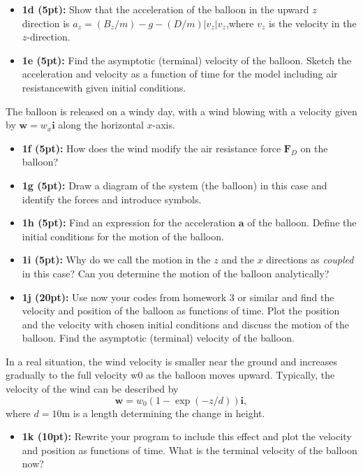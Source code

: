 \documentclass[%
oneside,                 %
final,                   %
10pt]{article}
\begin{document}
\begin{itemize}
\item \textbf{1d (5pt):} Show that the acceleration of the balloon in the upward $z$ direction is $a_z = (B_z/m)−g−(D/m)|v_z|v_z$,where $v_z$ is the velocity in the $z$-direction.

\item \textbf{1e (5pt):} Find the asymptotic (terminal) velocity of the balloon. Sketch the acceleration and velocity as a function of time for the model including air resistancewith given initial conditions.
\end{itemize}

\noindent
The balloon is released on a windy day, with a wind blowing with a velocity
given by $\bm{w} = w_x \bm{i}$ along the horizontal $x$-axis.

\begin{itemize}
\item \textbf{1f (5pt):} How does the wind modify the air resistance force $\bm{F}_D$ on the balloon?

\item \textbf{1g (5pt):} Draw a diagram of the system (the balloon) in this case and identify the forces and introduce symbols.

\item \textbf{1h (5pt):} Find an expression for the acceleration $\bm{a}$ of the balloon. Define the initial conditions for the motion of the balloon.

\item \textbf{1i (5pt):} Why do we call the motion in the $z$ and the $x$ directions as \emph{coupled} in this case? Can you determine the motion of the balloon analytically?

\item \textbf{1j (20pt):} Use now your codes from homework 3 or similar and find the velocity and position of the balloon as functions of time. Plot the position and the velocity with chosen initial conditions and discuss the motion of the balloon. Find the asymptotic (terminal) velocity of the balloon.
\end{itemize}

\noindent
In a real situation, the wind velocity is smaller near the ground and
increases gradually to the full velocity w0 as the balloon moves
upward. Typically, the velocity of the wind can be described
by
\[
\bm{w} = w_0 (1−\exp{(−z/d)}) \bm{i},
\]
where $d = 10$m is a length determining the change in height.

\begin{itemize}
\item \textbf{1k (10pt):} Rewrite your program to include this effect and plot the velocity and position as functions of time. What is the terminal velocity of the balloon now?
\end{itemize}
\end{document}
